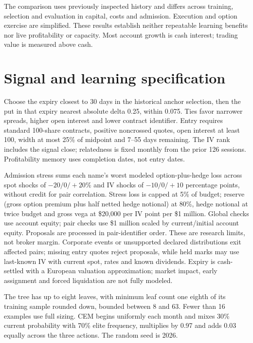 \documentclass[11pt,letterpaper]{article}
\newcommand{\money}[1]{\$#1}
\begin{document}
The comparison uses previously inspected history and differs across training,
selection and evaluation in capital, costs and admission. Execution and option
exercise are simplified. These results establish neither repeatable learning
benefits nor live profitability or capacity. Most account growth is cash
interest; trading value is measured above cash.

\clearpage
\appendix
\small
\section{Signal and learning specification}
\label{app:implementation}
Choose the expiry closest to 30 days in the historical anchor selection, then
the put in that expiry nearest absolute delta 0.25, within 0.075. Ties favor
narrower spreads, higher open interest and lower contract identifier. Entry
requires standard 100-share contracts, positive noncrossed quotes, open
interest at least 100, width at most 25\% of midpoint and 7--55 days remaining.
The IV rank includes the signal close; relatedness is fixed monthly from the
prior 126 sessions. Profitability memory uses completion dates, not entry dates.

Admission stress sums each name's worst modeled option-plus-hedge loss across
spot shocks of $-20/0/+20$\% and IV shocks of $-10/0/+10$ percentage points,
without credit for pair correlation. Stress loss is capped at 5\% of budget;
reserve (gross option premium plus half netted hedge notional) at 80\%, hedge
notional at twice budget and gross vega at \money{20,000} per IV point per
\money{1 million}. Global checks use account equity; pair checks use
\money{1 million} scaled by current/initial account equity. Proposals are
processed in pair-identifier order. These are research limits, not broker margin.
Corporate events or unsupported declared distributions exit affected pairs;
missing entry quotes reject proposals, while held marks may use last-known IV
with current spot, rates and known dividends. Expiry is cash-settled with a
European valuation approximation; market impact, early assignment and forced
liquidation are not fully modeled.

The tree has up to eight leaves, with minimum leaf count one eighth of its
training sample rounded down, bounded between 8 and 63. Fewer than 16 examples
use full sizing. CEM begins uniformly each month and mixes 30\% current
probability with 70\% elite frequency, multiplies by 0.97 and adds 0.03 equally
across the three actions. The random seed is 2026.
\end{document}
